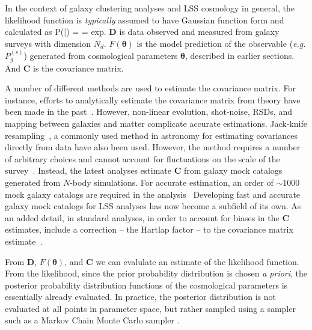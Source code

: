 In the context of galaxy clustering analyses and LSS cosmology in general, the likelihood 
function is {\em typically} assumed to have Gaussian function form and calculated as 
\beq \label{eq:likelihood}
P(|\bm{\theta}) =  = \; {\rm exp}.
\eeq
$\bm{D}$ is data observed and measured from galaxy surveys with dimension $N_d$. 
$F(\bm{\theta})$ is the model prediction of the observable (\emph{e.g.} 
$P_g^{(s)}$) generated from cosmological parameters $\bm{\theta}$, described in 
earlier sections. And $\bm{C}$ is the covariance matrix. 

A number of different methods are used to estimate the covariance matrix. For instance, 
efforts to analytically estimate the covariance matrix from theory have been made in 
the past~\citep{Hamilton:2006aa, Pope:2008aa, dePutter:2012aa}. However, 
non-linear evolution, shot-noise, RSDs, and mapping between galaxies and matter
complicate accurate estimations. Jack-knife resampling~\citep{Shao:1995aa}, 
a commonly used method in astronomy for estimating covariances directly from data 
have also been used. However, the method requires a number of arbitrary choices 
and cannot account for fluctuations on the scale of the survey~\citep{Norberg:2009aa}.
Instead, the latest analyses estimate $\bm{C}$ from galaxy mock catalogs generated 
from $N$-body simulations. For accurate estimation, an order of $\sim 1000$ mock
galaxy catalogs are required in the analysis~\citep{Scoccimarro:2002aa, McBridge:2011aa, 
Anderson:2012aa, Manera:2013aa, Rodriguez-Torres:2015aa, Kitaura:2016aa, Beutler:2016aa}
Developing fast and accurate galaxy mock catalogs for LSS analyses has now become a 
subfield of its own. As an added detail, in standard analyses, in order to 
account for biases in the $\bm{C}$ estimates, include a correction -- the Hartlap factor -- 
to the covariance matrix estimate~\citep{hartlap2007}.

From $\bm{D}$, $F(\bm{\theta})$, and $\bm{C}$ we can evalulate an estimate of the 
likelihood function. From the likelihood,
since the prior probability distribution is chosen {\em a priori}, the posterior 
probability distribution functions of the cosmological parameters is essentially already 
evaluated. In practice, the posterior distribution is not evaluated at all points in 
parameter space, but rather sampled using a sampler such as a Markov Chain Monte 
Carlo sampler \citep[\emph{e.g.} $\mathtt{emcee}$][]{emcee}.

